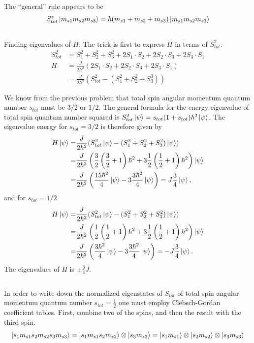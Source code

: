 \documentclass{article}
\begin{document}
The ``general'' rule appears to be
\begin{equation}
S^z_{tot}\ket{m_{s1}m_{s2}m_{s3}}=\hbar (m_{s1}+m_{s2}+m_{s3})\ket{m_{s1}m_{s2}m_{s3}}
\end{equation}


\subsection{}
Finding eigenvalues of $H$. The trick is first to express $H$ in terms of $S_{tot}^2$.
\begin{align*}
S_{tot}^2 &= S_1^2 + S_2^2 + S_3^2 + 2S_1\cdot S_2 + 2S_2\cdot S_3 + 2S_3\cdot S_1 \\
H &= \frac{J}{2\hbar^2}(2S_1\cdot S_2 + 2S_2\cdot S_3 + 2S_3\cdot S_1) \\
  &= \frac{J}{2\hbar^2}(S_{tot}^2-(S_1^2+S_2^2+S_3^3))
\end{align*}

We know from the previous problem that total spin angular momentum quantum number $s_{tot}$ must be $3/2$ or $1/2$. The general formula for the energy eigenvalue of total spin quantum number squared is $S^2_{tot}\ket{\psi}=s_{tot}(1+s_{tot})\hbar^2\ket{\psi}$. The eigenvalue energy for $s_{tot}=3/2$ is therefore given by
\begin{align*}
H\ket{\psi} =& \frac{J}{2\hbar^2}(S_{tot}^2\ket{\psi}-(S_1^2+S_2^2+S_3^2)\ket{\psi})\\
=&\frac{J}{2\hbar^2}\left(\frac{3}{2}\left(\frac{3}{2}+1\right)\hbar^2 +3\frac{1}{2}\left(\frac{1}{2}+1\right)\hbar^2\right)\ket{\psi}\\
=&\frac{J}{2\hbar^2}\left(\frac{15\hbar^2}{4}\ket{\psi} -3\frac{3\hbar^2}{4}\ket{\psi} \right) = J\frac{3}{4}\ket{\psi},
\end{align*}
and for $s_{tot}=1/2$
\begin{align*}
H\ket{\psi} =& \frac{J}{2\hbar^2}(S_{tot}^2\ket{\psi}-(S_1^2+S_2^2+S_3^2)\ket{\psi})\\
=&\frac{J}{2\hbar^2}\left(\frac{1}{2}\left(\frac{1}{2}+1\right)\hbar^2 +3\frac{1}{2}\left(\frac{1}{2}+1\right)\hbar^2\right)\ket{\psi}\\
=&\frac{J}{2\hbar^2}\left(\frac{3\hbar^2}{4}\ket{\psi} -3\frac{3\hbar^2}{4}\ket{\psi} \right) = -J\frac{3}{4}\ket{\psi}.
\end{align*}
The eigenvalues of $H$ is $\pm\frac{3}{4}J$.

\subsection{}
In order to write down the normalized eigenstates of $S_{tot}$ of total spin angular momentum quantum number $s_{tot}=\frac{1}{2}$ one must employ Clebsch-Gordan coefficient tables. First, combine two of the spins, and then the result with the third spin.
\begin{equation*}
\ket{s_1m_{s1}s_2m_{s2}s_3m_{s3}}=\ket{s_1m_{s1}s_2m_{s2}}\otimes\ket{s_3m_{s3}}=\ket{s_1m_{s1}}\otimes\ket{s_2m_{s2}}\otimes\ket{s_3m_{s3}}
\end{equation*}
\end{document}
